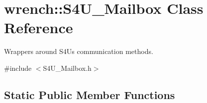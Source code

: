 \hypertarget{classwrench_1_1_s4_u___mailbox}{}\section{wrench\+:\+:S4\+U\+\_\+\+Mailbox Class Reference}
\label{classwrench_1_1_s4_u___mailbox}


Wrappers around S4U\textquotesingle{}s communication methods.  




{\ttfamily \#include $<$S4\+U\+\_\+\+Mailbox.\+h$>$}

\subsection*{Static Public Member Functions}

